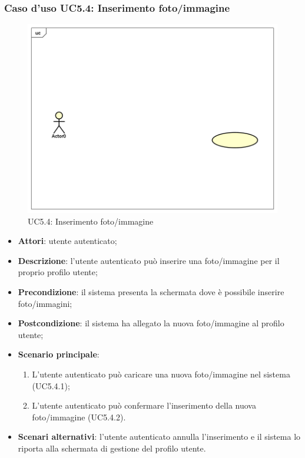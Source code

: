 \subsubsection{Caso d'uso UC5.4: Inserimento foto/immagine}
\label{UC5.4}
\begin{figure}[h]
	\centering
	\includegraphics[scale=0.5,keepaspectratio]{UML/UC5_4.png}
	\caption{UC5.4: Inserimento foto/immagine}
\end{figure}
\begin{itemize}
	\item \textbf{Attori}: utente autenticato;
	\item \textbf{Descrizione}: l'utente autenticato può inserire una foto/immagine per il proprio profilo utente;
	\item \textbf{Precondizione}: il sistema presenta la schermata dove è possibile inserire foto/immagini;
	\item \textbf{Postcondizione}: il sistema ha allegato la nuova foto/immagine al profilo utente;
	\item \textbf{Scenario principale}:
	\begin{enumerate}
		\item L'utente autenticato può caricare una nuova foto/immagine nel sistema (UC5.4.1);
		\item L'utente autenticato può confermare l'inserimento della nuova foto/immagine (UC5.4.2).
	\end{enumerate}
	\item \textbf{Scenari alternativi}: l'utente autenticato annulla l'inserimento e il sistema lo riporta alla schermata di gestione del profilo utente.
\end{itemize}

